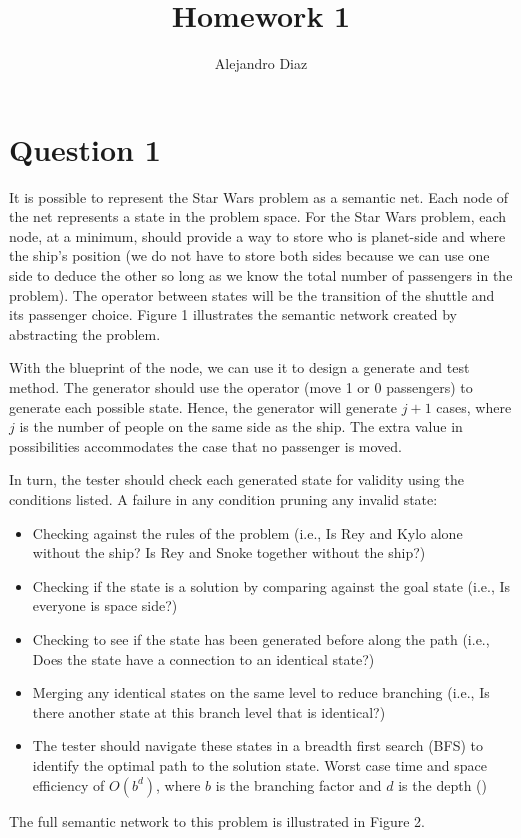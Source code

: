 \documentclass[
	letterpaper, %
]{jdf}
\author{Alejandro Diaz}
\title{Homework 1}
\begin{document}

\maketitle

\section{Question 1}
It is possible to represent the Star Wars problem as a semantic net. Each node of the net represents a state in the problem space. For the Star Wars problem, each node, at a minimum, should provide a way to store who is planet-side and where the ship's position (we do not have to store both sides because we can use one side to deduce the other so long as we know the total number of passengers in the problem). The operator between states will be the transition of the shuttle and its passenger choice. Figure 1 illustrates the semantic network created by abstracting the problem.  

With the blueprint of the node, we can use it to design a generate and test method. The generator should use the operator (move 1 or 0 passengers) to generate each possible state. Hence, the generator will generate $j + 1$ cases, where $j$ is the number of people on the same side as the ship. The extra value in possibilities accommodates the case that no passenger is moved.  

In turn, the tester should check each generated state for validity using the conditions listed. A failure in any condition pruning any invalid state: 

\begin{itemize}
	\item Checking against the rules of the problem (i.e., Is Rey and Kylo alone without the ship? Is Rey and Snoke together without the ship?) 
	\item Checking if the state is a solution by comparing against the goal state (i.e., Is everyone is space side?) 
	\item Checking to see if the state has been generated before along the path (i.e., Does the state have a connection to an identical state?) 
	\item Merging any identical states on the same level to reduce branching (i.e., Is there another state at this branch level that is identical?) 
	\item The tester should navigate these states in a breadth first search (BFS) to identify the optimal path to the solution state. Worst case time and space efficiency of $O(b^d)$, where $b$ is the branching factor and $d$ is the depth (\cite{korf_artificial_1999})
\end{itemize}
The full semantic network to this problem is illustrated in Figure 2.
\end{document}
